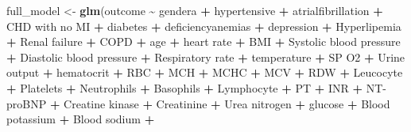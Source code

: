 \documentclass[
]{article}
\newenvironment{Shaded}{\begin{snugshade}}{\end{snugshade}}
\newcommand{\AttributeTok}[1]{\textcolor[rgb]{0.13,0.29,0.53}{#1}}
\newcommand{\FunctionTok}[1]{\textcolor[rgb]{0.13,0.29,0.53}{\textbf{#1}}}
\newcommand{\NormalTok}[1]{#1}
\newcommand{\OtherTok}[1]{\textcolor[rgb]{0.56,0.35,0.01}{#1}}
\newcommand{\SpecialCharTok}[1]{\textcolor[rgb]{0.81,0.36,0.00}{\textbf{#1}}}
\newcommand{\StringTok}[1]{\textcolor[rgb]{0.31,0.60,0.02}{#1}}
\begin{document}
\begin{Shaded}
\begin{Highlighting}[]
\NormalTok{full\_model }\OtherTok{\textless{}{-}} \FunctionTok{glm}\NormalTok{(outcome }\SpecialCharTok{\textasciitilde{}}\NormalTok{ gendera }\SpecialCharTok{+}\NormalTok{ hypertensive }\SpecialCharTok{+}\NormalTok{ atrialfibrillation }\SpecialCharTok{+} 
                    \StringTok{\textasciigrave{}}\AttributeTok{CHD with no MI}\StringTok{\textasciigrave{}} \SpecialCharTok{+}\NormalTok{ diabetes }\SpecialCharTok{+}\NormalTok{ deficiencyanemias }\SpecialCharTok{+}\NormalTok{ depression }
                  \SpecialCharTok{+}\NormalTok{ Hyperlipemia }\SpecialCharTok{+} \StringTok{\textasciigrave{}}\AttributeTok{Renal failure}\StringTok{\textasciigrave{}} \SpecialCharTok{+} 
\NormalTok{            COPD }\SpecialCharTok{+}\NormalTok{ age }\SpecialCharTok{+} \StringTok{\textasciigrave{}}\AttributeTok{heart rate}\StringTok{\textasciigrave{}} \SpecialCharTok{+}\NormalTok{ BMI }\SpecialCharTok{+} \StringTok{\textasciigrave{}}\AttributeTok{Systolic blood pressure}\StringTok{\textasciigrave{}} \SpecialCharTok{+} 
            \StringTok{\textasciigrave{}}\AttributeTok{Diastolic blood pressure}\StringTok{\textasciigrave{}} \SpecialCharTok{+} \StringTok{\textasciigrave{}}\AttributeTok{Respiratory rate}\StringTok{\textasciigrave{}} \SpecialCharTok{+}\NormalTok{ temperature }\SpecialCharTok{+} 
            \StringTok{\textasciigrave{}}\AttributeTok{SP O2}\StringTok{\textasciigrave{}} \SpecialCharTok{+} \StringTok{\textasciigrave{}}\AttributeTok{Urine output}\StringTok{\textasciigrave{}} \SpecialCharTok{+}\NormalTok{ hematocrit }\SpecialCharTok{+}\NormalTok{ RBC }\SpecialCharTok{+}\NormalTok{ MCH }\SpecialCharTok{+}\NormalTok{ MCHC }\SpecialCharTok{+}\NormalTok{ MCV }\SpecialCharTok{+} 
\NormalTok{            RDW }\SpecialCharTok{+}\NormalTok{ Leucocyte }\SpecialCharTok{+}\NormalTok{ Platelets }\SpecialCharTok{+}\NormalTok{ Neutrophils }\SpecialCharTok{+}\NormalTok{ Basophils }\SpecialCharTok{+}\NormalTok{ Lymphocyte }\SpecialCharTok{+} 
\NormalTok{            PT }\SpecialCharTok{+}\NormalTok{ INR }\SpecialCharTok{+} \StringTok{\textasciigrave{}}\AttributeTok{NT{-}proBNP}\StringTok{\textasciigrave{}} \SpecialCharTok{+} \StringTok{\textasciigrave{}}\AttributeTok{Creatine kinase}\StringTok{\textasciigrave{}} \SpecialCharTok{+}\NormalTok{ Creatinine }\SpecialCharTok{+} 
              \StringTok{\textasciigrave{}}\AttributeTok{Urea nitrogen}\StringTok{\textasciigrave{}} \SpecialCharTok{+}\NormalTok{ glucose }\SpecialCharTok{+} \StringTok{\textasciigrave{}}\AttributeTok{Blood potassium}\StringTok{\textasciigrave{}} \SpecialCharTok{+} \StringTok{\textasciigrave{}}\AttributeTok{Blood sodium}\StringTok{\textasciigrave{}} \SpecialCharTok{+} 

\end{Highlighting}
\end{Shaded}
\end{document}
